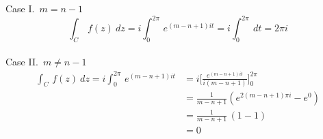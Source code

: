 \begin{example}
\begin{itemize}[itemsep=1.5em]
\medskip
\noindent
Case I.\ $m = n-1$
\[\int_C\,f(z)\ dz = i\int_0^{2\pi}\,e^{(m - n + 1)it} = i\int_0^{2\pi}\ dt = 2\pi i\]\\
Case II.\ $m \neq n-1$
\begin{align*}
\int_C\,f(z)\ dz = i\int_0^{2\pi}\,e^{(m - n + 1)it} &= i\Bigg[\frac{e^{(m - n + 1)it}}{i(m - n + 1)}\Bigg]_0^{2\pi}\\[0.5em]
 &= \frac{1}{m - n + 1}\left(e^{2(m - n + 1)\pi i} - e^0\right)\\[0.5em]
 &= \frac{1}{m - n + 1}\,(1 - 1)\\[1em]
 &= 0
\end{align*}
%
\end{itemize}

\medskip


\end{example}

